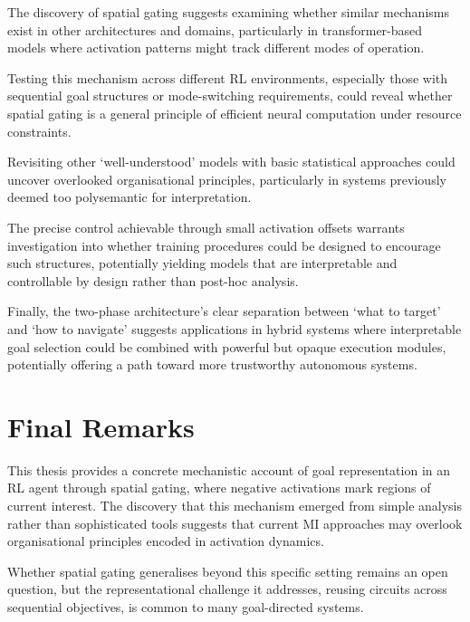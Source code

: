 The discovery of spatial gating suggests examining whether similar mechanisms exist in other architectures and domains, particularly in transformer-based models where activation patterns might track different modes of operation.

Testing this mechanism across different RL environments, especially those with sequential goal structures or mode-switching requirements, could reveal whether spatial gating is a general principle of efficient neural computation under resource constraints.

Revisiting other `well-understood' models with basic statistical approaches could uncover overlooked organisational principles, particularly in systems previously deemed too polysemantic for interpretation.

The precise control achievable through small activation offsets  warrants investigation into whether training procedures could be designed to encourage such structures, potentially yielding models that are interpretable and controllable by design rather than post-hoc analysis.

Finally, the two-phase architecture's clear separation between `what to target' and `how to navigate' suggests applications in hybrid systems where interpretable goal selection could be combined with powerful but opaque execution modules, potentially offering a path toward more trustworthy autonomous systems.

\section{Final Remarks}
\label{sec:final_remarks}

This thesis provides a concrete mechanistic account of goal representation in an RL agent through spatial gating, where negative activations mark regions of current interest. The discovery that this mechanism emerged from simple analysis rather than sophisticated tools suggests that current MI approaches may overlook organisational principles encoded in activation dynamics.

Whether spatial gating generalises beyond this specific setting remains an open question, but the representational challenge it addresses, reusing circuits across sequential objectives, is common to many goal-directed systems. 
